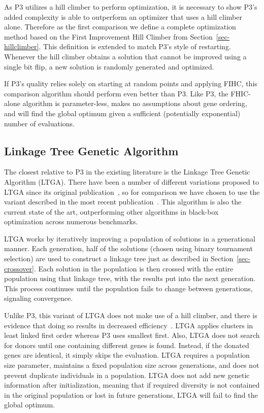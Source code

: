 \documentclass{sig-alternate}
\begin{document}
As P3 utilizes a hill climber to perform optimization, it is necessary
to show P3's added complexity is able to outperform an optimizer that
uses a hill climber alone.  Therefore as the first comparison we
define a complete optimization method based on the First Improvement
Hill Climber from Section~\ref{sec-hillclimber}.  This
definition is extended to match P3's style of restarting. Whenever the
hill climber obtains a solution that cannot be improved using a single
bit flip, a new solution is randomly generated and optimized.

If P3's quality relies solely on starting at random points and
applying FIHC, this comparison algorithm should perform even better
than P3.  Like P3, the FHIC-alone algorithm is parameter-less, makes no
assumptions about gene ordering, and will find the global optimum given
a sufficient (potentially exponential) number of evaluations.

\subsection{Linkage Tree Genetic Algorithm}
\label{sec-ltga}
The closest relative to P3 in the existing literature is the Linkage Tree Genetic Algorithm
(LTGA).  There have been a number of different variations proposed to LTGA since
its original publication~\cite{thierens:2010:ltga}, so for comparison we have chosen
to use the variant described in the most recent publication~\cite{thierens:2013:ltgahiff}.
This algorithm is also the current state of the art, outperforming other algorithms
in black-box optimization across numerous benchmarks.

LTGA works by iteratively improving a population of solutions in a generational manner.
Each generation, half of the solutions (chosen using binary tournament selection)
are used to construct a linkage tree just as described in Section~\ref{sec-crossover}.
Each solution in the population is then crossed with the entire population using that
linkage tree, with the results put into the next generation.  This process continues
until the population fails to change between generations, signaling convergence.

Unlike P3, this variant of LTGA does not make use of a hill climber,
and there is evidence that doing so results in decreased
efficiency~\cite{bosman:2011:lsbbo}.  LTGA applies clusters in least
linked first order whereas P3 uses smallest first.  Also, LTGA does
not search for donors until one containing different genes is found.
Instead, if the donated genes are identical, it simply skips the
evaluation.  LTGA requires a population size parameter, maintains a
fixed population size across generations, and does not prevent
duplicate individuals in a population.  LTGA does not add new genetic
information after initialization, meaning that if required diversity
is not contained in the original population or lost in future
generations, LTGA will fail to find the global optimum.
\end{document}
